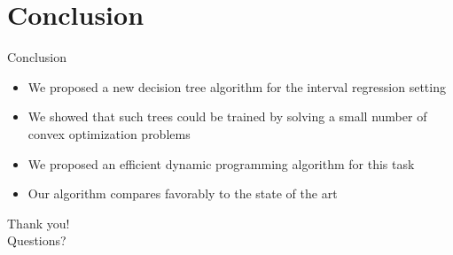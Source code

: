 \documentclass{beamer}
\begin{document}
\section{Conclusion}

\begin{frame}{Conclusion}
	\begin{itemize}
		\item<+-> We proposed a new decision tree algorithm for the interval regression setting
		\vspace{3mm}
		\item<+-> We showed that such trees could be trained by solving a small number of convex optimization problems
		\vspace{3mm}
		\item<+-> We proposed an efficient dynamic programming algorithm for this task
		\vspace{3mm}
		\item<+-> Our algorithm compares favorably to the state of the art
	\end{itemize}
\end{frame}

\begin{frame}[noframenumbering]
	\begin{center}
		{\huge Thank you!}\\[20mm]
		{\huge Questions?}
	\end{center}
\end{frame}
\end{document}
